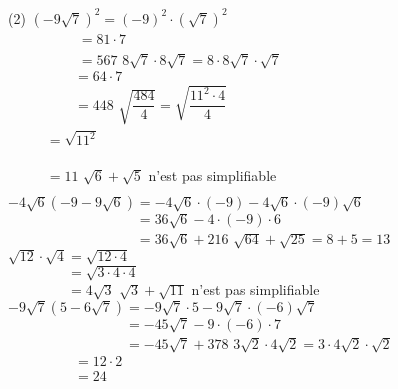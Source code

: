 \documentclass[a4paper,12pt]{report}
\begin{document}
\begin{cora}\phantom{ }

\begin{tasks}(2)
\task $\left(-9 \sqrt{7}\right)^{2}=(-9)^{2}\cdot \left(\sqrt{7}\right)^{2}$
                        $\phantom{\left(-9 \sqrt{7}\right)^{2}}$\\
                        $\phantom{\left(-9 \sqrt{7}\right)^{2}}=81\cdot 7$\\
                        $\phantom{\left(-9 \sqrt{7}\right)^{2}}=567$
\task $ 8 \sqrt{7}\cdot 8 \sqrt{7}=8\cdot 8 \sqrt{7} \cdot \sqrt{7}$\\
                        $\phantom{8 \sqrt{7}\cdot 8 \sqrt{7}}=64\cdot 7$\\
                        $\phantom{8 \sqrt{7}\cdot 8 \sqrt{7}}=448$
\task $ \sqrt{\dfrac{484}{4}}= \sqrt{\dfrac{11^{2}\cdot4}{4}}$\\
                        $\phantom{\sqrt{\dfrac{484}{4}}}=\sqrt{11^{2}}$\\
                        $\phantom{\sqrt{\dfrac{484}{4}}}=11$ 
\task $  \sqrt{6}+\sqrt{5}$ n'est pas simplifiable
\task $-4 \sqrt{6}\left( -9  -9\sqrt{6}\right)=
                        -4 \sqrt{6}\cdot (-9)-4 \sqrt{6}\cdot (-9)\sqrt{6}$\\
                        $\phantom{-4 \sqrt{6}\left( -9  -9\sqrt{6}\right)}=36\sqrt{6}-4\cdot (-9)\cdot 6$\\
                        $\phantom{-4 \sqrt{6}\left( -9  -9\sqrt{6}\right)}=36\sqrt{6}+216$
\task $  \sqrt{64}+\sqrt{25}=8+5=13$ 
\task $ \sqrt{12}\cdot \sqrt{4}=\sqrt{12\cdot4}$\\
                        $\phantom{\sqrt{12}\cdot \sqrt{4}}=\sqrt{3\cdot4\cdot4}$\\
                        $\phantom{\sqrt{12}\cdot \sqrt{4}}=4\sqrt{3}$ 
\task $  \sqrt{3}+\sqrt{11}$ n'est pas simplifiable
\task $-9 \sqrt{7}\left( 5  -6\sqrt{7}\right)=
                        -9 \sqrt{7}\cdot 5-9 \sqrt{7}\cdot (-6)\sqrt{7}$\\
                        $\phantom{-9 \sqrt{7}\left( 5  -6\sqrt{7}\right)}=-45\sqrt{7}-9\cdot (-6)\cdot 7$\\
                        $\phantom{-9 \sqrt{7}\left( 5  -6\sqrt{7}\right)}=-45\sqrt{7}+378$
\task $ 3 \sqrt{2}\cdot 4 \sqrt{2}=3\cdot 4 \sqrt{2} \cdot \sqrt{2}$\\
                        $\phantom{3 \sqrt{2}\cdot 4 \sqrt{2}}=12\cdot 2$\\
                        $\phantom{3 \sqrt{2}\cdot 4 \sqrt{2}}=24$
\end{tasks}

\end{cora}
\end{document}
